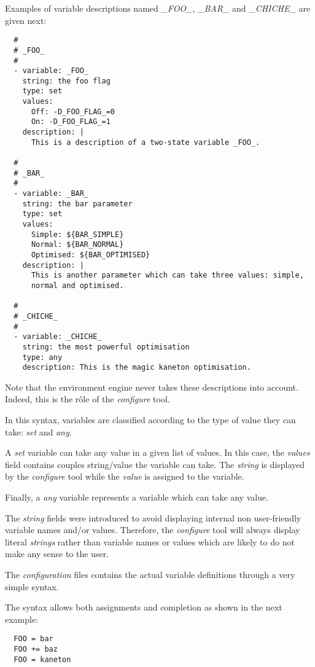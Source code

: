 Examples of variable descriptions named \textit{\_FOO\_}, \textit{\_BAR\_}
and \textit{\_CHICHE\_} are given next:

\begin{verbatim}
  #
  # _FOO_
  #
  - variable: _FOO_
    string: the foo flag
    type: set
    values:
      Off: -D_FOO_FLAG_=0
      On: -D_FOO_FLAG_=1
    description: |
      This is a description of a two-state variable _FOO_.

  #
  # _BAR_
  #
  - variable: _BAR_
    string: the bar parameter
    type: set
    values:
      Simple: ${BAR_SIMPLE}
      Normal: ${BAR_NORMAL}
      Optimised: ${BAR_OPTIMISED}
    description: |
      This is another parameter which can take three values: simple,
      normal and optimised.

  #
  # _CHICHE_
  #
  - variable: _CHICHE_
    string: the most powerful optimisation
    type: any
    description: This is the magic kaneton optimisation.
\end{verbatim}

Note that the environment engine never takes these descriptions into account.
Indeed, this is the r\^ole of the \textit{configure} tool.

In this syntax, variables are classified according to the type of value
they can take: \textit{set} and \textit{any}.

A \textit{set} variable can take any value in a given list of values. In
this case, the \textit{values} field contains couples string/value the
variable can take. The \textit{string} is displayed by the \textit{configure}
tool while the \textit{value} is assigned to the variable.

Finally, a \textit{any} variable represents a variable which can take any
value.

The \textit{string} fields were introduced to avoid displaying internal
non user-friendly variable names and/or values. Therefore, the
\textit{configure} tool will always display literal \textit{strings}
rather than variable names or values which are likely to do not make any
sense to the user.



The \textit{configuration} files contains the actual variable definitions
through a very simple syntax.

The syntax allows both assignments and completion as shown in the next example:

\begin{verbatim}
  FOO = bar
  FOO += baz
  FOO = kaneton
\end{verbatim}

